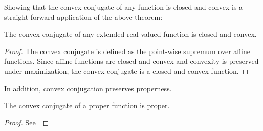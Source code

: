 Showing that the convex conjugate of any function is closed and convex is a straight-forward application of the above theorem:
\begin{theorem}
	The convex conjugate of any extended real-valued function is closed and convex.
\end{theorem}
\begin{proof}
	The convex conjugate is defined as the point-wise supremum over affine functions.
	Since affine functions are closed and convex and convexity is preserved under maximization, the convex conjugate is a closed and convex function.
\end{proof}
In addition, convex conjugation preserves properness.
\begin{theorem}
	The convex conjugate of a proper function is proper.
\end{theorem}
\begin{proof}
	See~\cite[theorem 4.5]{beck_firstorder_2017}
\end{proof}

